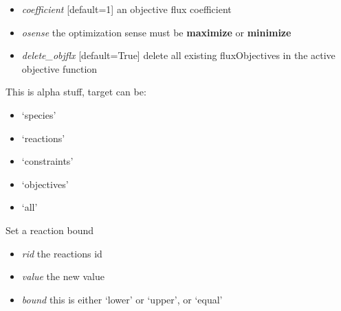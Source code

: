 \documentclass[a4paper,11pt,english]{sphinxmanual}
\begin{document}
\begin{fulllineitems}
\begin{fulllineitems}
\begin{itemize}
\item {} 
\emph{coefficient} {[}default=1{]} an objective flux coefficient

\item {} 
\emph{osense} the optimization sense must be \textbf{maximize} or \textbf{minimize}

\item {} 
\emph{delete\_objflx} {[}default=True{]} delete all existing fluxObjectives in the active objective function

\end{itemize}

\end{fulllineitems}


\begin{fulllineitems}
\label{modules_doc:cbmpy.CBModel.Model.setPrefix}
This is alpha stuff, target can be:
\begin{itemize}
\item {} 
`species'

\item {} 
`reactions'

\item {} 
`constraints'

\item {} 
`objectives'

\item {} 
`all'

\end{itemize}

\end{fulllineitems}


\begin{fulllineitems}
\label{modules_doc:cbmpy.CBModel.Model.setReactionBound}
Set a reaction bound
\begin{itemize}
\item {} 
\emph{rid} the reactions id

\item {} 
\emph{value} the new value

\item {} 
\emph{bound} this is either `lower' or `upper', or `equal'


\end{itemize}
\end{fulllineitems}
\end{fulllineitems}
\end{document}

